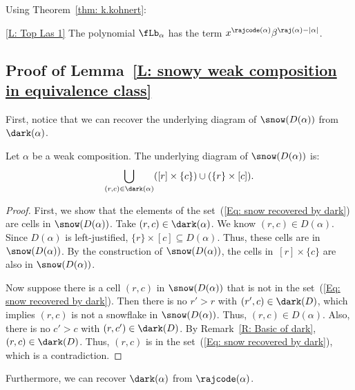 Using Theorem~\ref{thm: k.kohnert}:

\begin{manuallemma}{\ref{L: Top Las 1}}
The polynomial $\fLb_\alpha$ has the term $x^{\rajcode(\alpha)} \beta^{\raj(\alpha) - |\alpha|}$.
\end{manuallemma} 

\subsection{Proof of Lemma~\ref{L: snowy weak composition in equivalence class}}
\label{SS: equivalence}

First, notice that we can recover the underlying diagram of $\snow(D(\alpha))$
from $\dark(\alpha)$.

\begin{lemma}
\label{L: dark recovers snow}
Let $\alpha$ be a weak composition. 
The underlying diagram of $\snow(D(\alpha))$
is:
\begin{align}
\label{Eq: snow recovered by dark}
\bigcup_{(r,c) \in \dark(\alpha)} ([r] \times \{c\}) \cup (\{r\} \times [c]).
\end{align}
\end{lemma}
\begin{proof}
First, we show that the elements of the set~(\ref{Eq: snow recovered by dark})
are cells in $\snow(D(\alpha))$.
Take $(r,c) \in \dark(\alpha)$.
We know $(r,c) \in D(\alpha)$.
Since $D(\alpha)$ is left-justified, 
$\{r\} \times [c] \subseteq D(\alpha)$.
Thus, these cells are in $\snow(D(\alpha))$.
By the construction of $\snow(D(\alpha))$,
the cells in~$[r] \times \{c\}$ are also 
in $\snow(D(\alpha))$.

Now suppose there is a cell $(r, c)$ 
in $\snow(D(\alpha))$
that is not in the 
set~(\ref{Eq: snow recovered by dark}).
Then there is no $r' > r$ with $(r', c) \in \dark(D)$,
which implies $(r,c)$ is not a snowflake 
in $\snow(D(\alpha))$.
Thus, $(r,c) \in D(\alpha)$.
Also, there is no $c' > c$ with $(r, c') \in \dark(D)$.
By Remark~\ref{R: Basic of dark},
$(r,c) \in \dark(D)$.
Thus, $(r, c)$ is in the 
set~(\ref{Eq: snow recovered by dark}),
which is a contradiction.
\end{proof}

Furthermore, 
we can recover $\dark(\alpha)$ from $\rajcode(\alpha)$.

